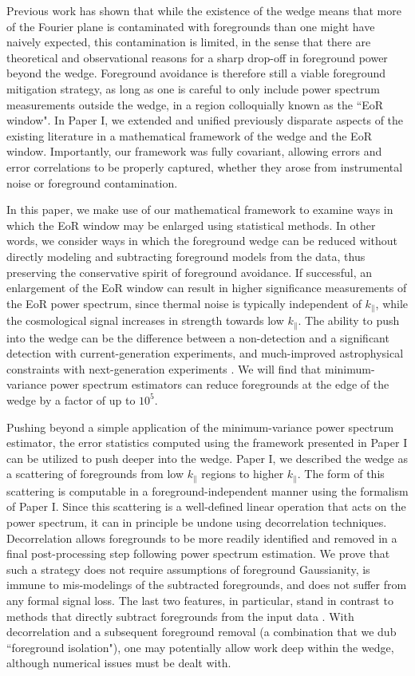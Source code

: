 \documentclass[twocolumn,aps,prd,nofootinbib,showpacs]{revtex4-1}
\begin{document}
Previous work has shown that while the existence of the wedge means that more of the Fourier plane is contaminated with foregrounds than one might have naively expected, this contamination is limited, in the sense that there are theoretical and observational reasons for a sharp drop-off in foreground power beyond the wedge.  Foreground avoidance is therefore still a viable foreground mitigation strategy, as long as one is careful to only include power spectrum measurements outside the wedge, in a region colloquially known as the ``EoR window".  In Paper I, we extended and unified previously disparate aspects of the existing literature in a mathematical framework of the wedge and the EoR window.  Importantly, our framework was fully covariant, allowing errors and error correlations to be properly captured, whether they arose from instrumental noise or foreground contamination.

In this paper, we make use of our mathematical framework to examine ways in which the EoR window may be enlarged using statistical methods.  In other words, we consider ways in which the foreground wedge can be reduced without directly modeling and subtracting foreground models from the data, thus preserving the conservative spirit of foreground avoidance.  If successful, an enlargement of the EoR window can result in higher significance measurements of the EoR power spectrum, since thermal noise is typically independent of $k_\parallel$, while the cosmological signal increases in strength towards low $k_\parallel$.  The ability to push into the wedge can be the difference between a non-detection and a significant detection with current-generation experiments, and much-improved astrophysical constraints with next-generation experiments \cite{Pober2014}.  We will find that minimum-variance power spectrum estimators can reduce foregrounds at the edge of the wedge by a factor of up to $10^5$.

Pushing beyond a simple application of the minimum-variance power spectrum estimator, the error statistics computed using the framework presented in Paper I can be utilized to push deeper into the wedge.  Paper I, we described the wedge as a scattering of foregrounds from low $k_\parallel$ regions to higher $k_\parallel$.  The form of this scattering is computable in a foreground-independent manner using the formalism of Paper I.  Since this scattering is a well-defined linear operation that acts on the power spectrum, it can in principle be undone using decorrelation techniques.  Decorrelation allows foregrounds to be more readily identified and removed in a final post-processing step following power spectrum estimation.  We prove that such a strategy does not require assumptions of foreground Gaussianity, is immune to mis-modelings of the subtracted foregrounds, and does not suffer from any formal signal loss.  The last two features, in particular, stand in contrast to methods that directly subtract foregrounds from the input data \cite{Wang2006,Liu2009a,Bowman2009,Harker2009,Liu2009b,Liu2012}.  With decorrelation and a subsequent foreground removal (a combination that we dub ``foreground isolation"), one may potentially allow work deep within the wedge, although numerical issues must be dealt with.
\end{document}
